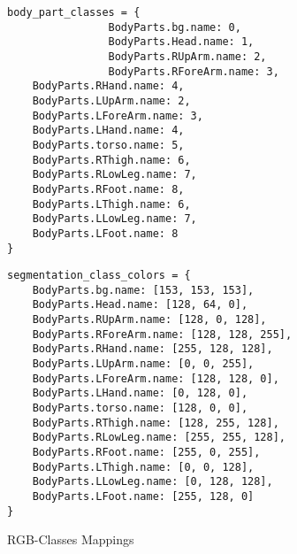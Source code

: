 \begin{figure}

    \fontsmall
    \begin{minipage}{0.29\linewidth}
        \begin{Verbatim}[frame=topline,label=Mapping to classes,framesep=1mm]
            body_part_classes = {
                BodyParts.bg.name: 0,
                BodyParts.Head.name: 1,
                BodyParts.RUpArm.name: 2,
                BodyParts.RForeArm.name: 3,
    BodyParts.RHand.name: 4,
    BodyParts.LUpArm.name: 2,
    BodyParts.LForeArm.name: 3,
    BodyParts.LHand.name: 4,
    BodyParts.torso.name: 5,
    BodyParts.RThigh.name: 6,
    BodyParts.RLowLeg.name: 7,
    BodyParts.RFoot.name: 8,
    BodyParts.LThigh.name: 6,
    BodyParts.LLowLeg.name: 7,
    BodyParts.LFoot.name: 8
}
    \end{Verbatim}
\end{minipage}\hfill
\begin{minipage}{0.49\linewidth}
    \begin{Verbatim}[frame=topline,label=Mapping to RGB values, framesep=1mm]
segmentation_class_colors = {
    BodyParts.bg.name: [153, 153, 153],
    BodyParts.Head.name: [128, 64, 0],
    BodyParts.RUpArm.name: [128, 0, 128],
    BodyParts.RForeArm.name: [128, 128, 255],
    BodyParts.RHand.name: [255, 128, 128],
    BodyParts.LUpArm.name: [0, 0, 255],
    BodyParts.LForeArm.name: [128, 128, 0],
    BodyParts.LHand.name: [0, 128, 0],
    BodyParts.torso.name: [128, 0, 0],
    BodyParts.RThigh.name: [128, 255, 128],
    BodyParts.RLowLeg.name: [255, 255, 128],
    BodyParts.RFoot.name: [255, 0, 255],
    BodyParts.LThigh.name: [0, 0, 128],
    BodyParts.LLowLeg.name: [0, 128, 128],
    BodyParts.LFoot.name: [255, 128, 0]
}
    \end{Verbatim}

\end{minipage}
    \caption{RGB-Classes Mappings}
    \label{fig:rgb-mappings}
    \end{figure}


